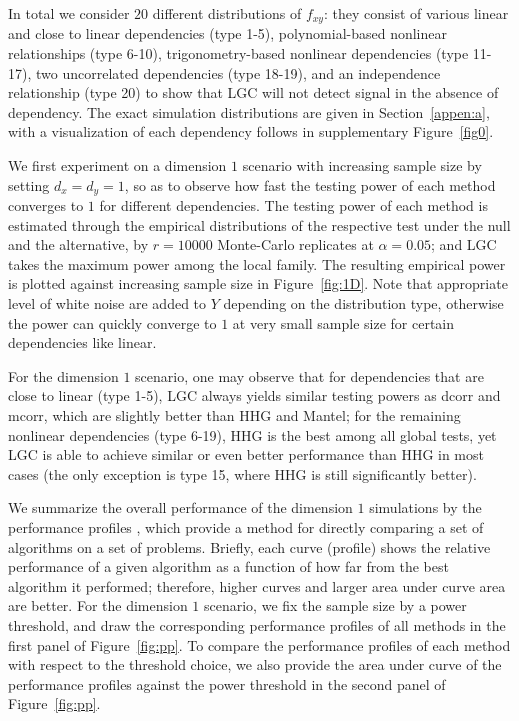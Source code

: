 \documentclass[11pt]{article}
\begin{document}
In total we consider $20$ different distributions of $f_{xy}$: they consist of various linear and close to linear dependencies (type 1-5), polynomial-based nonlinear relationships (type 6-10), trigonometry-based nonlinear dependencies (type 11-17), two uncorrelated dependencies (type 18-19), and an independence relationship (type 20) to show that LGC will not detect signal in the absence of dependency. The exact simulation distributions are given in Section~\ref{appen:a}, with a visualization of each dependency follows in supplementary Figure~\ref{fig0}.

We first experiment on a dimension $1$ scenario with increasing sample size by setting $d_{x}=d_{y}=1$, so as to observe how fast the testing power of each method converges to $1$ for different dependencies. The testing power of each method is estimated through the empirical distributions of the respective test under the null and the alternative, by $r=10000$ Monte-Carlo replicates at $\alpha=0.05$; and LGC takes the maximum power among the local family. The resulting empirical power is plotted against increasing sample size in Figure~\ref{fig:1D}. Note that appropriate level of white noise are added to $Y$ depending on the distribution type, otherwise the power can quickly converge to $1$ at very small sample size for certain dependencies like linear.

For the dimension $1$ scenario, one may observe that for dependencies that are close to linear (type 1-5), LGC always yields similar testing powers as dcorr and mcorr, which are slightly better than HHG and Mantel; for the remaining nonlinear dependencies (type 6-19), HHG is the best among all global tests, yet LGC is able to achieve similar or even better performance than HHG in most cases (the only exception is type 15, where HHG is still significantly better). 

We summarize the overall performance of the dimension $1$ simulations by the performance profiles \cite{DolanMore2002}, which provide a method for directly comparing a set of algorithms on a set of problems.  Briefly, each curve (profile) shows the relative performance of a given algorithm as a function of how far from the best algorithm it performed; therefore, higher curves and larger area under curve area are better. For the dimension $1$ scenario, we fix the sample size by a power threshold, and draw the corresponding performance profiles of all methods in the first panel of Figure~\ref{fig:pp}. To compare the performance profiles of each method with respect to the threshold choice, we also provide the area under curve of the performance profiles against the power threshold in the second panel of Figure~\ref{fig:pp}.
\end{document}

